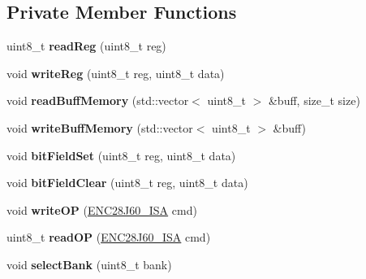 \subsection*{Private Member Functions}
\begin{DoxyCompactItemize}
\item 
\mbox{\label{classEnc28j60_a8aa52f4f9150cfd8975c01c388952be3}} 
uint8\+\_\+t {\bfseries read\+Reg} (uint8\+\_\+t reg)
\item 
\mbox{\label{classEnc28j60_a44f843303ed9e671e867910c337d4421}} 
void {\bfseries write\+Reg} (uint8\+\_\+t reg, uint8\+\_\+t data)
\item 
\mbox{\label{classEnc28j60_a52901d3be0ae0b8ad202927a2e7e3d0f}} 
void {\bfseries read\+Buff\+Memory} (std\+::vector$<$ uint8\+\_\+t $>$ \&buff, size\+\_\+t size)
\item 
\mbox{\label{classEnc28j60_ac242c72302b61d6d4b81508935665c8c}} 
void {\bfseries write\+Buff\+Memory} (std\+::vector$<$ uint8\+\_\+t $>$ \&buff)
\item 
\mbox{\label{classEnc28j60_ac5853b6da39441aa8370bd3e809a3fd8}} 
void {\bfseries bit\+Field\+Set} (uint8\+\_\+t reg, uint8\+\_\+t data)
\item 
\mbox{\label{classEnc28j60_a60cd171ca97f496cbf51350c743e8247}} 
void {\bfseries bit\+Field\+Clear} (uint8\+\_\+t reg, uint8\+\_\+t data)
\item 
\mbox{\label{classEnc28j60_a823d4bd466e9fd160c8730141c8e2e83}} 
void {\bfseries write\+OP} (\hyperlink{structENC28J60__ISA}{E\+N\+C28\+J60\+\_\+\+I\+SA} cmd)
\item 
\mbox{\label{classEnc28j60_a7be0cb9c172c45453783009636548d09}} 
uint8\+\_\+t {\bfseries read\+OP} (\hyperlink{structENC28J60__ISA}{E\+N\+C28\+J60\+\_\+\+I\+SA} cmd)
\item 
\mbox{\label{classEnc28j60_a3d0223a215213be14cccf8a6eb4c65e6}} 
void {\bfseries select\+Bank} (uint8\+\_\+t bank)
\item 
\mbox{\label{classEnc28j60_a1293d524f38225318c67bec2856c2cf3}} 

\end{DoxyCompactItemize}
